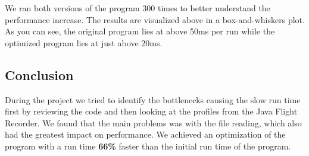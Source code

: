 We ran both versions of the program 300 times to better understand the performance increase. 
The results are visualized above in a box-and-whiskers plot. As you can see, the original program lies at above 50ms per run while the optimized program lies at just above 20ms.

\newpage
\subsection{Conclusion}
\label{sec:2.8}
During the project we tried to identify the bottlenecks causing the slow run time first by reviewing the code and then looking at the profiles from the Java Flight Recorder. We found that the main problems was with the file reading, which also had the greatest impact on performance. We achieved an optimization of the  program with a run time \textbf{66\%} faster than the initial run time of the program. 


\newpage
\vspace{0.5cm}



